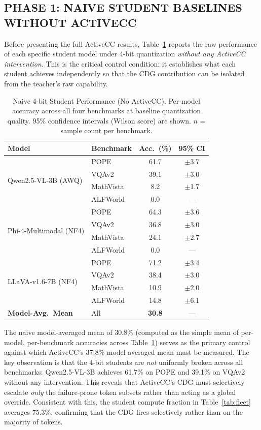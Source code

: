 \documentclass{ieeetmlcn}
\begin{document}
\subsection{PHASE 1: NAIVE STUDENT BASELINES WITHOUT ACTIVECC}
Before presenting the full ActiveCC results, Table~\ref{tab:naivebaseline} reports the raw performance of each specific student model under 4-bit quantization \emph{without any ActiveCC intervention}. This is the critical control condition: it establishes what each student achieves independently so that the CDG contribution can be isolated from the teacher's raw capability.

\begin{table}[htbp]
\caption{Naive 4-bit Student Performance (No ActiveCC). Per-model accuracy across all four benchmarks at baseline quantization quality. 95\% confidence intervals (Wilson score) are shown. $n$ = sample count per benchmark.}
\label{tab:naivebaseline}
\centering
\begin{tabular}{llcc}
\toprule
\textbf{Model} & \textbf{Benchmark} & \textbf{Acc.\ (\%)} & \textbf{95\% CI} \\
\midrule
\multirow{4}{*}{Qwen2.5-VL-3B (AWQ)}
  & POPE      & 61.7 & $\pm$3.7 \\
  & VQAv2     & 39.1 & $\pm$3.0 \\
  & MathVista &  8.2 & $\pm$1.7 \\
  & ALFWorld  &  0.0 & ---      \\
\midrule
\multirow{4}{*}{Phi-4-Multimodal (NF4)}
  & POPE      & 64.3 & $\pm$3.6 \\
  & VQAv2     & 36.8 & $\pm$3.0 \\
  & MathVista & 24.1 & $\pm$2.7 \\
  & ALFWorld  &  0.0 & ---      \\
\midrule
\multirow{4}{*}{LLaVA-v1.6-7B (NF4)}
  & POPE      & 71.2 & $\pm$3.4 \\
  & VQAv2     & 38.4 & $\pm$3.0 \\
  & MathVista & 10.9 & $\pm$2.0 \\
  & ALFWorld  & 14.8 & $\pm$6.1 \\
\midrule
\textbf{Model-Avg.\ Mean} & All & \textbf{30.8} & --- \\
\bottomrule
\end{tabular}
\end{table}

The naive model-averaged mean of $30.8\%$ (computed as the simple mean of per-model, per-benchmark accuracies across Table~\ref{tab:naivebaseline}) serves as the primary control against which ActiveCC's 37.8\% model-averaged mean must be measured. The key observation is that the 4-bit students are \emph{not} uniformly broken across all benchmarks: Qwen2.5-VL-3B achieves 61.7\% on POPE and 39.1\% on VQAv2 without any intervention. This reveals that ActiveCC's CDG must selectively escalate \emph{only} the failure-prone token subsets rather than acting as a global override. Consistent with this, the student compute fraction in Table~\ref{tab:fleet} averages 75.3\%, confirming that the CDG fires selectively rather than on the majority of tokens.
\end{document}
